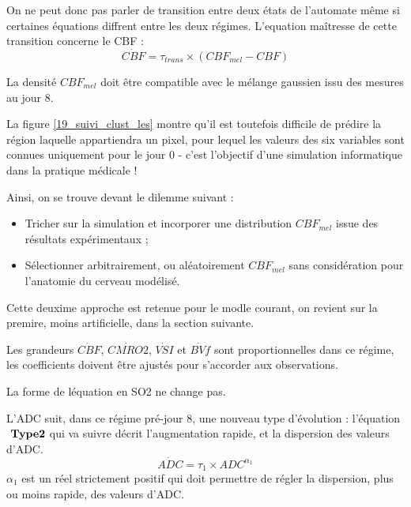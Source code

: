 \begin{description}
\par
On ne peut donc pas parler de transition entre deux \'etats de l'automate m\^eme si certaines \'equations diffrent entre les deux r\'egimes.
L'equation ma\^itresse de cette transition concerne le CBF :
\begin{equation}
\dot{CBF} = \tau_{trans}\times\left(CBF_{mel}-CBF\right)
\label{cbf_l_tr}
\end{equation}

%
La densit\'e $CBF_{mel}$ doit \^etre compatible avec le m\'elange gaussien issu des mesures au jour 8.

\par
La figure \ref{19_suivi_clust_les} montre qu'il est toutefois difficile de pr\'edire la r\'egion  laquelle appartiendra un pixel, %
pour lequel les valeurs des six variables sont connues uniquement pour le jour 0 %
- c'est l'objectif d'une simulation informatique dans la pratique m\'edicale !

\par
Ainsi, on se trouve devant le dilemme suivant :
\begin{itemize}
\item Tricher sur la simulation et incorporer une distribution $CBF_{mel}$ issue des r\'esultats exp\'erimentaux ;
\item S\'electionner arbitrairement, ou al\'eatoirement $CBF_{mel}$ sans consid\'eration pour l'anatomie du cerveau mod\'elis\'e.
\end{itemize}

Cette deuxime approche est retenue pour le modle courant, on revient sur la premire, moins artificielle, %
dans la section suivante.

\par
Les grandeurs $\dot{CBF}$, $\dot{CMRO2}$, $\dot{VSI}$ et $\dot{BVf}$ sont proportionnelles dans ce r\'egime, %
les coefficients doivent \^etre ajust\'es pour s'accorder aux observations.

\par
La forme de l\'equation en SO2 ne change pas.%

\par
L'ADC suit, dans ce r\'egime pr\'e-jour 8, une nouveau type d'\'evolution : %
l'\'equation $\ \mathbf{Type 2}$ qui va suivre d\'ecrit l'augmentation rapide, et la dispersion des valeurs d'ADC.
\begin{equation}
\dot{ADC} = \tau_1\times ADC^{\alpha_1}
\label{adc_is_tr}
\end{equation}
$\alpha_1$ est un r\'eel strictement positif qui doit permettre de r\'egler la dispersion, plus ou moins rapide, des valeurs d'ADC.
%


\end{description}
